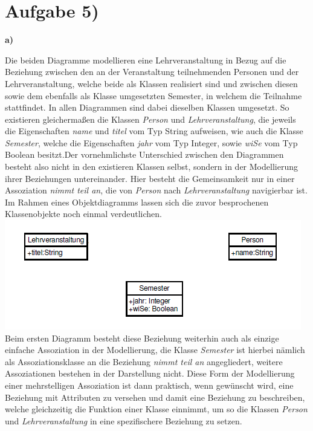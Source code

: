 \documentclass{swp1}
\begin{document}
\section*{Aufgabe 5)}

\textbf{a)}

Die beiden Diagramme modellieren eine Lehrveranstaltung in Bezug auf die Beziehung zwischen den an der Veranstaltung teilnehmenden Personen und der Lehrveranstaltung, welche beide als Klassen realisiert sind und zwischen diesen sowie dem ebenfalls als Klasse umgesetzten Semester, in welchem die Teilnahme stattfindet. In allen Diagrammen sind dabei dieselben Klassen umgesetzt. So existieren gleichermaßen die Klassen \emph{Person} und \emph{Lehrveranstaltung}, die jeweils die Eigenschaften \emph{name} und \emph{titel} vom Typ String aufweisen, wie auch die Klasse \emph{Semester}, welche die Eigenschaften \emph{jahr} vom Typ Integer, sowie \emph{wiSe} vom Typ Boolean besitzt.Der vornehmlichste Unterschied zwischen den Diagrammen besteht also nicht in den existieren Klassen selbst, sondern in der Modellierung ihrer Beziehungen untereinander. Hier besteht die Gemeinsamkeit nur in einer Assoziation \emph{nimmt teil an}, die von \emph{Person} nach \emph{Lehrveranstaltung} navigierbar ist.\newline
\newline
Im Rahmen eines Objektdiagramms lassen sich die zuvor besprochenen Klassenobjekte noch einmal verdeutlichen.\newline
\newline
\includegraphics{Objektdiagramm}
\newline
Beim ersten Diagramm besteht diese Beziehung weiterhin auch als einzige einfache Assoziation in der Modellierung, die Klasse \emph{Semester} ist hierbei nämlich als Assoziationsklasse an die Beziehung \emph{nimmt teil an} angegliedert, weitere Assoziationen bestehen in der Darstellung nicht. Diese Form der Modellierung einer mehrstelligen Assoziation ist dann praktisch, wenn gewünscht wird, eine Beziehung mit Attributen zu versehen und damit eine Beziehung zu beschreiben, welche gleichzeitig die Funktion einer Klasse einnimmt, um so die Klassen \emph{Person} und \emph{Lehrveranstaltung} in eine spezifischere Beziehung zu setzen.\newline
\end{document}

